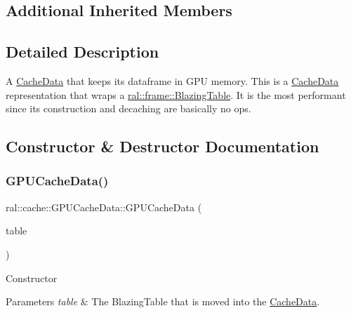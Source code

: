 \subsection*{Additional Inherited Members}


\subsection{Detailed Description}
A \hyperlink{classral_1_1cache_1_1CacheData}{Cache\+Data} that keeps its dataframe in G\+PU memory. This is a \hyperlink{classral_1_1cache_1_1CacheData}{Cache\+Data} representation that wraps a \hyperlink{classral_1_1frame_1_1BlazingTable}{ral\+::frame\+::\+Blazing\+Table}. It is the most performant since its construction and decaching are basically no ops. 

\subsection{Constructor \& Destructor Documentation}
\mbox{\label{classral_1_1cache_1_1GPUCacheData_aecac4050bf35d52a069842bda9e01906}} 
\subsubsection{\texorpdfstring{G\+P\+U\+Cache\+Data()}{GPUCacheData()}\hspace{0.1cm}{\footnotesize\ttfamily [1/2]}}
{\footnotesize\ttfamily ral\+::cache\+::\+G\+P\+U\+Cache\+Data\+::\+G\+P\+U\+Cache\+Data (\begin{DoxyParamCaption}\item[{std\+::unique\+\_\+ptr$<$ \hyperlink{classral_1_1frame_1_1BlazingTable}{ral\+::frame\+::\+Blazing\+Table} $>$}]{table }\end{DoxyParamCaption})\hspace{0.3cm}{\ttfamily [inline]}}

Constructor 
\begin{DoxyParams}{Parameters}
{\em table} & The Blazing\+Table that is moved into the \hyperlink{classral_1_1cache_1_1CacheData}{Cache\+Data}. \\
\hline
\end{DoxyParams}
\mbox{\label{classral_1_1cache_1_1GPUCacheData_a0844305a3dca5ec2582254b3ba83f7d7}} 
